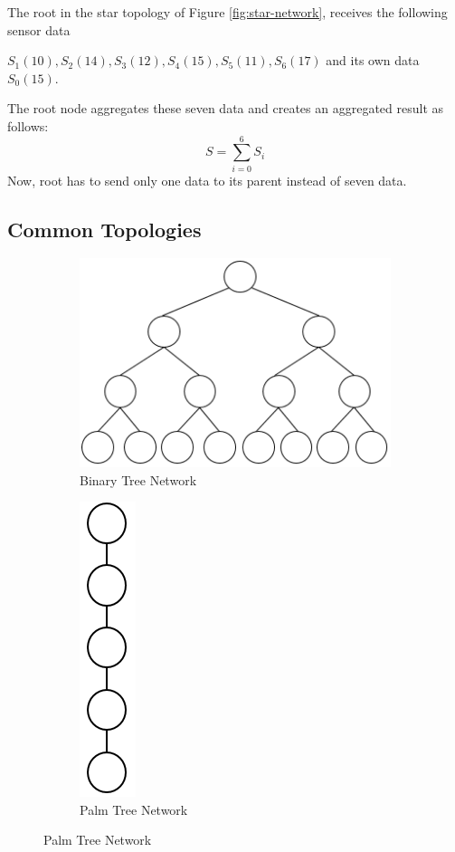 \documentclass[%
  slidesonly,%
  semlayer%
  ]{seminar}                                  %
\begin{document}
\begin{slide}
      The root in the star topology of Figure \ref{fig:star-network}, receives the following sensor data

 $S_{1}(10), S_{2}(14), S_{3}(12), S_{4}(15), S_{5}(11),S_{6}(17)$ and its own data $S_{0}(15)$. 

      The root node aggregates these seven data and creates an aggregated result as follows:
      \begin{equation}
        S = \sum_{i=0}^6 S_{i}
      \end{equation}
      Now, root has to send only one data to its parent instead of seven data.
      \clearpage

  \subsection*{Common Topologies}

      \begin{figure}
        \centering
        \begin{subfigure}
          \centering
          \includegraphics[width=.4\linewidth]{images/binary-tree.png}
          \caption{Binary Tree Network}
          \label{fig:binary-tree}
        \end{subfigure}

        \begin{subfigure}
          \centering
          \includegraphics[scale=0.5]{images/palm-tree.png}
          \caption{Palm Tree Network}
          \label{fig:palm-tree}
        \end{subfigure}%
        

\end{figure}
\end{slide}
\end{document}

